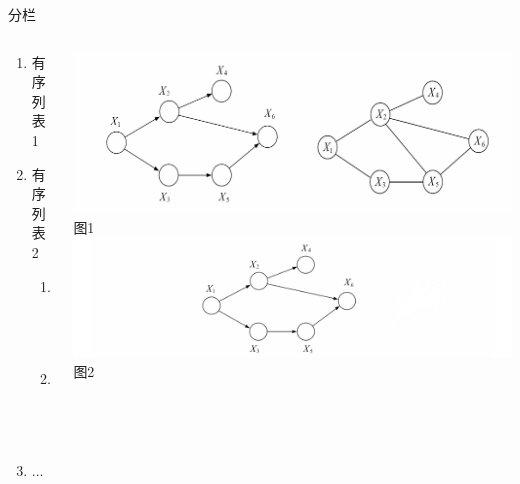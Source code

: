 \documentclass{beamer}
\begin{document}
\begin{frame}{分栏}
    \begin{columns}
        \begin{column}{0.4\textwidth}
        \begin{center}
            \begin{minipage}{0.4\textwidth}
            \begin{enumerate}
                \item 有序列表1
                \item 有序列表2
                \begin{enumerate}
                    \item 有序子表
                    \item 有序子表
                \end{enumerate}
                \item ...
            \end{enumerate}
            \end{minipage}
        \end{center}
        \end{column}
        
        \begin{column}{0.6\textwidth}
            \centering
            \includegraphics[width=\textwidth]{assets/example/11.1.1.png}\\
            图1
            \\
            \includegraphics[width=\textwidth]{assets/example/11.2.1.png}\\
            图2
        \end{column}
    \end{columns}
\end{frame}
\end{document}
